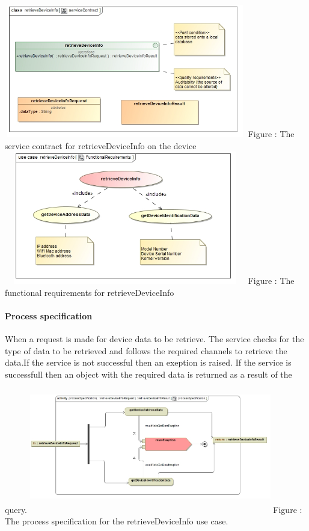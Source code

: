 \documentclass[hidelinks, 12pt, oneside]{article}
\begin{document}
		\includegraphics[width=400px,height=220px]{img/serviceContractRetrieveDeviceInfo.jpg}
		Figure : The service contract for retrieveDeviceInfo on the device
		\newline
		\includegraphics[width=400px,height=220px]{img/functionalRequirementsRetrieveDeviceInfo.jpg}
		Figure : The functional requirements for retrieveDeviceInfo
		\newline
		
		\paragraph{Process specification}
		When a request is made for device data to be retrieve. The service checks for the type of data to be retrieved and follows the required channels to retrieve the data.If the service is not successful then an exeption is raised. If the service is successfull then an object with the required data is returned as a result of the query.\newline\newline
		\includegraphics[width=400px,height=220px]{img/processSpecificationRetrieveDeviceInfo.jpg}
		Figure : The process specification for the retrieveDeviceInfo use case.
		
\end{document}
